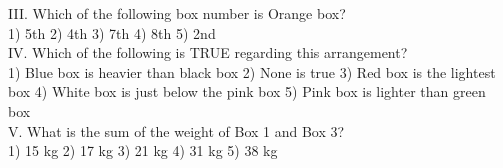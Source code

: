 \documentclass[
]{article}
\begin{document}
III. Which of the following box number is Orange box?\\
1) 5th \hspace{2mm}2) 4th \hspace{2mm}3) 7th \hspace{2mm}4) 8th \hspace{2mm}5) 2nd\\

IV. Which of the following is TRUE regarding this arrangement?\\
1) Blue box is heavier than black box \hspace{2mm}2) None is true
\hspace{2mm}3) Red box is the lightest box \hspace{2mm}4) White box is just below the pink box
\hspace{2mm}5) Pink box is lighter than green box\\

V. What is the sum of the weight of Box 1 and Box 3?\\
1) 15 kg \hspace{2mm}2) 17 kg \hspace{2mm}3) 21 kg \hspace{2mm}4) 31 kg \hspace{2mm}5) 38 kg\\
\end{document}

